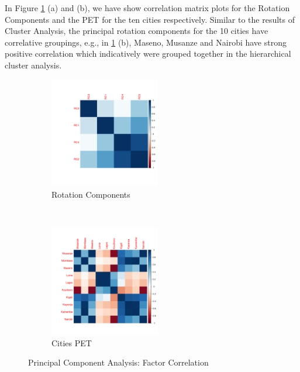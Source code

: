 \documentclass[12pt,a4paper]{article}
\begin{document}
In Figure  \ref{fig:factor_corr} (a) and (b), we have show correlation matrix plots for the Rotation Components and the PET for the ten cities respectively.  Similar to the results of Cluster Analysis,  the principal rotation components for the 10 cities have correlative groupings,  e.g.,  in \ref{fig:factor_corr}  (b),  Maseno, Musanze and Nairobi have strong positive correlation which indicatively were grouped together in the hierarchical cluster analysis.
\begin{figure}[!h]
    \centering
    \begin{subfigure}[t]{0.5\textwidth}
        \centering
        \includegraphics[height=1.9in]{./gaphics/q003_a.png}
        \caption{Rotation Components}
    \end{subfigure}%
    ~ 
    \begin{subfigure}[t]{0.5\textwidth}
        \centering
        \includegraphics[height=1.9in]{./gaphics/q003_b.png}
        \caption{Cities PET}
    \end{subfigure}
    \caption{Principal Component Analysis: Factor Correlation}
    \label{fig:factor_corr}
\end{figure}
\end{document}
